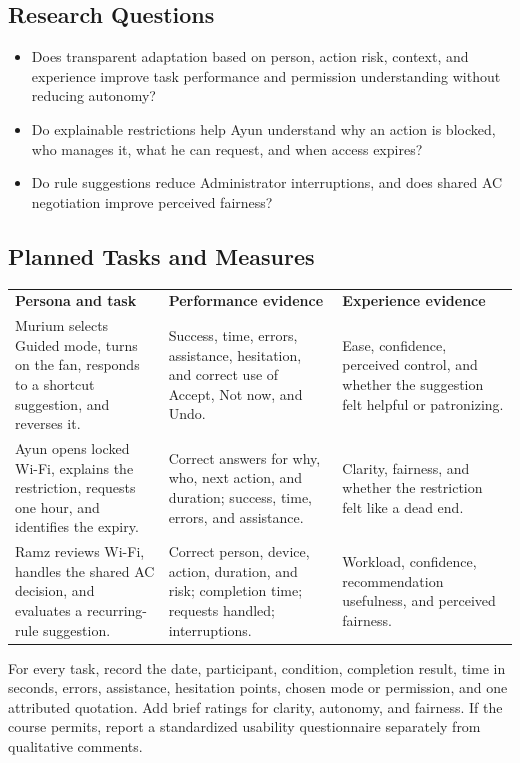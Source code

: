 \documentclass[11pt,letterpaper]{article}
\newcommand{\thead}[1]{\cellcolor{SharedNavy}\color{white}\bfseries #1}
\begin{document}
\subsection{Research Questions}

\begin{itemize}
  \item Does transparent adaptation based on person, action risk, context, and experience improve task performance and permission understanding without reducing autonomy?
  \item Do explainable restrictions help Ayun understand why an action is blocked, who manages it, what he can request, and when access expires?
  \item Do rule suggestions reduce Administrator interruptions, and does shared AC negotiation improve perceived fairness?
\end{itemize}

\subsection{Planned Tasks and Measures}

\small
{}
\begin{tabularx}{\textwidth}{P{2.05in} P{2.1in} Y}
  \thead{Persona and task} & \thead{Performance evidence} & \thead{Experience evidence}\\
  Murium selects Guided mode, turns on the fan, responds to a shortcut suggestion, and reverses it. & Success, time, errors, assistance, hesitation, and correct use of Accept, Not now, and Undo. & Ease, confidence, perceived control, and whether the suggestion felt helpful or patronizing.\\
  Ayun opens locked Wi-Fi, explains the restriction, requests one hour, and identifies the expiry. & Correct answers for why, who, next action, and duration; success, time, errors, and assistance. & Clarity, fairness, and whether the restriction felt like a dead end.\\
  Ramz reviews Wi-Fi, handles the shared AC decision, and evaluates a recurring-rule suggestion. & Correct person, device, action, duration, and risk; completion time; requests handled; interruptions. & Workload, confidence, recommendation usefulness, and perceived fairness.\\
\end{tabularx}
\normalsize

For every task, record the date, participant, condition, completion result, time in seconds,
errors, assistance, hesitation points, chosen mode or permission, and one attributed
quotation. Add brief ratings for clarity, autonomy, and fairness. If the course permits,
report a standardized usability questionnaire separately from qualitative comments.
\end{document}
